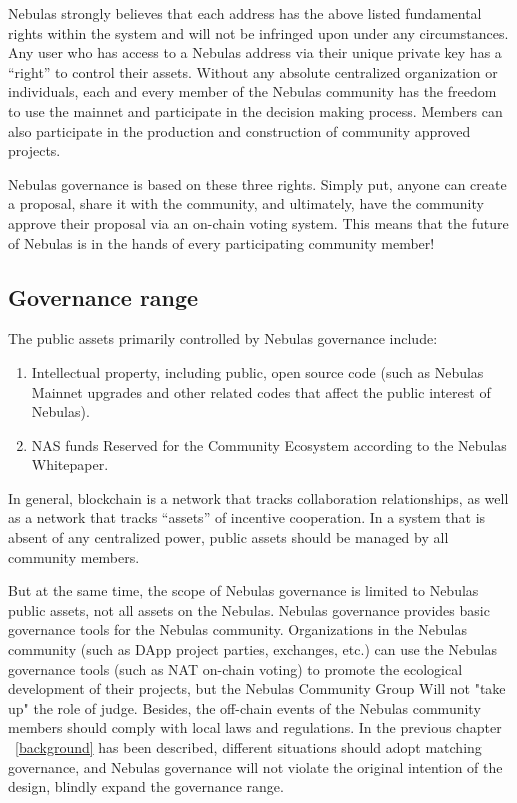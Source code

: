 Nebulas strongly believes that each address has the above listed fundamental rights within the system and will not be infringed upon under any circumstances. Any user who has access to a Nebulas address via their unique private key has a “right” to control their assets. Without any absolute centralized organization or individuals, each and every member of the Nebulas community has the freedom to use the mainnet and participate in the decision making process. Members can also participate in the production and construction of community approved projects. 

Nebulas governance is based on these three rights. Simply put, anyone can create a proposal, share it with the community, and ultimately, have the community approve their proposal via an on-chain voting system. This means that the future of Nebulas is in the hands of every participating community member!

\subsection{Governance range}

The public assets primarily controlled by Nebulas governance include:

\begin{enumerate}
	\item Intellectual property, including public, open source code (such as Nebulas Mainnet upgrades and other related codes that affect the public interest of Nebulas).
	\item NAS funds Reserved for the Community Ecosystem according to the Nebulas Whitepaper.
\end{enumerate}

In general, blockchain is a network that tracks collaboration relationships, as well as a network that tracks “assets” of incentive cooperation. In a system that is absent of any centralized power, public assets should be managed by all community members.

But at the same time, the scope of Nebulas governance is limited to Nebulas public assets, not all assets on the Nebulas. Nebulas governance provides basic governance tools for the Nebulas community. Organizations in the Nebulas community (such as DApp project parties, exchanges, etc.) can use the Nebulas governance tools (such as NAT on-chain voting) to promote the ecological development of their projects, but the Nebulas Community Group Will not "take up" the role of judge. Besides, the off-chain events of the Nebulas community members should comply with local laws and regulations. In the previous chapter ~\ref{background} has been described, different situations should adopt matching governance, and Nebulas governance will not violate the original intention of the design, blindly expand the governance range.

